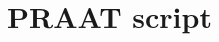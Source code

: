 \documentclass[11pt,a4paper,openany]{memoir}\usepackage[]{graphicx}\usepackage[]{color}
\begin{document}
\chapter{PRAAT script}
\label{a:getmeasure}







\end{document}
